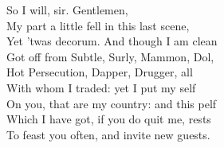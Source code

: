 \documentclass[a4paper,oneside,12pt]{memoir}
\begin{document}
\begin{drama*}
\facespeaks {} So I will, sir. Gentlemen,\\
My part a little fell in this last scene,\\
Yet 'twas decorum. And though I am clean\\
Got off from Subtle, Surly, Mammon, Dol,\\
Hot Persecution, Dapper, Drugger, all\\
With whom I traded: yet I put my self\\
On you, that are my country: and this pelf\\
Which I have got, if you do quit me, rests\\
To feast you often, and invite new guests.\\

\end{drama*}
\end{document}
